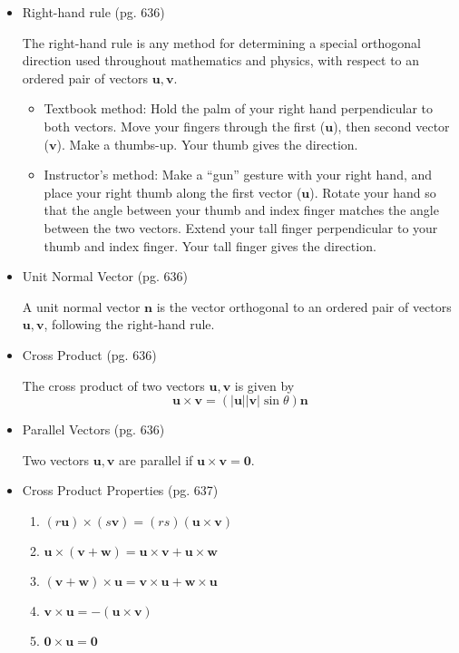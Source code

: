 \documentclass[12pt]{article}
\theoremstyle{plain}
\theoremstyle{definition}
\theoremstyle{remark}
\newcommand{\vect}[1]{\mathbf{#1}}
\begin{document}
		\begin{itemize}
		\item Right-hand rule (pg. 636)
		
		The right-hand rule is any method for determining a special orthogonal direction used throughout mathematics and physics, with respect to an ordered pair of vectors $\vect{u},\vect{v}$.
		
			\begin{itemize}
			\item Textbook method: Hold the palm of your right hand perpendicular to both vectors. Move your fingers through the first ($\vect{u}$), then second vector ($\vect{v}$). Make a thumbs-up. Your thumb gives the direction.
		
			\item Instructor's method: Make a ``gun'' gesture with your right hand, and place your right thumb along the first vector ($\vect{u}$). Rotate your hand so that the angle between your thumb and index finger matches the angle between the two vectors. Extend your tall finger perpendicular to your thumb and index finger. Your tall finger gives the direction.
			\end{itemize}
			
		\item Unit Normal Vector (pg. 636)
		
		A unit normal vector $\vect{n}$ is the vector orthogonal to an ordered pair of vectors $\vect{u},\vect{v}$, following the right-hand rule.
		
		\item Cross Product (pg. 636)
		
		The cross product of two vectors $\vect{u},\vect{v}$ is given by \[\vect{u} \times \vect{v} = (|\vect{u}||\vect{v}|\sin \theta) \vect{n} \]
		
		\item Parallel Vectors (pg. 636)
		
		Two vectors $\vect{u},\vect{v}$ are parallel if $\vect{u} \times \vect{v} = \vect{0}$.
		
		\item Cross Product Properties (pg. 637)
		
			\begin{enumerate}
			\item $(r\vect{u}) \times (s\vect{v}) = (rs)(\vect{u} \times \vect{v})$
			\item $\vect{u} \times (\vect{v} + \vect{w}) = \vect{u} \times \vect{v} + \vect{u} \times \vect{w}$
			\item $(\vect{v} + \vect{w}) \times \vect{u} = \vect{v} \times \vect{u} + \vect{w} \times \vect{u}$
			\item $\vect{v} \times \vect{u} = -(\vect{u} \times \vect{v})$
			\item $\vect{0} \times \vect{u} = \vect{0}$
			\end{enumerate}


\end{itemize}
\end{document}
